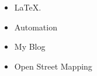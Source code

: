 \begin{print}


\begin{itemize}
\item \LaTeX.
\item Automation
\item My Blog
\item Open Street Mapping
\end{itemize}

\end{print}
\newpage
